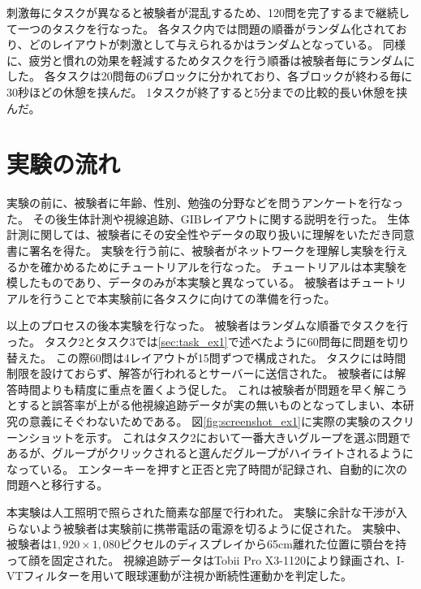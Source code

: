 \documentclass{kuee}
\begin{document}
刺激毎にタスクが異なると被験者が混乱するため、120問を完了するまで継続して一つのタスクを行なった。
各タスク内では問題の順番がランダム化されており、どのレイアウトが刺激として与えられるかはランダムとなっている。
同様に、疲労と慣れの効果を軽減するためタスクを行う順番は被験者毎にランダムにした。
各タスクは20問毎の6ブロックに分かれており、各ブロックが終わる毎に30秒ほどの休憩を挟んだ。
1タスクが終了すると5分までの比較的長い休憩を挟んだ。

\section{実験の流れ}
実験の前に、被験者に年齢、性別、勉強の分野などを問うアンケートを行なった。
その後生体計測や視線追跡、GIBレイアウトに関する説明を行った。
生体計測に関しては、被験者にその安全性やデータの取り扱いに理解をいただき同意書に署名を得た。
実験を行う前に、被験者がネットワークを理解し実験を行えるかを確かめるためにチュートリアルを行なった。
チュートリアルは本実験を模したものであり、データのみが本実験と異なっている。
被験者はチュートリアルを行うことで本実験前に各タスクに向けての準備を行った。

以上のプロセスの後本実験を行なった。
被験者はランダムな順番でタスクを行った。
タスク2とタスク3では\ref{sec:task_ex1}で述べたように60問毎に問題を切り替えた。
この際60問は4レイアウトが15問ずつで構成された。
タスクには時間制限を設けておらず、解答が行われるとサーバーに送信された。
被験者には解答時間よりも精度に重点を置くよう促した。
これは被験者が問題を早く解こうとすると誤答率が上がる他視線追跡データが実の無いものとなってしまい、本研究の意義にそぐわないためである。
図\ref{fig:screenshot_ex1}に実際の実験のスクリーンショットを示す。
これはタスク2において一番大きいグループを選ぶ問題であるが、グループがクリックされると選んだグループがハイライトされるようになっている。
エンターキーを押すと正否と完了時間が記録され、自動的に次の問題へと移行する。

本実験は人工照明で照らされた簡素な部屋で行われた。
実験に余計な干渉が入らないよう被験者は実験前に携帯電話の電源を切るように促された。
実験中、被験者は$1,920 \times 1,080$ピクセルのディスプレイから65cm離れた位置に顎台を持って顔を固定された。
視線追跡データはTobii Pro X3-1120により録画され、I-VTフィルター\cite{olsen2012tobii}を用いて眼球運動が注視か断続性運動かを判定した。
\end{document}
